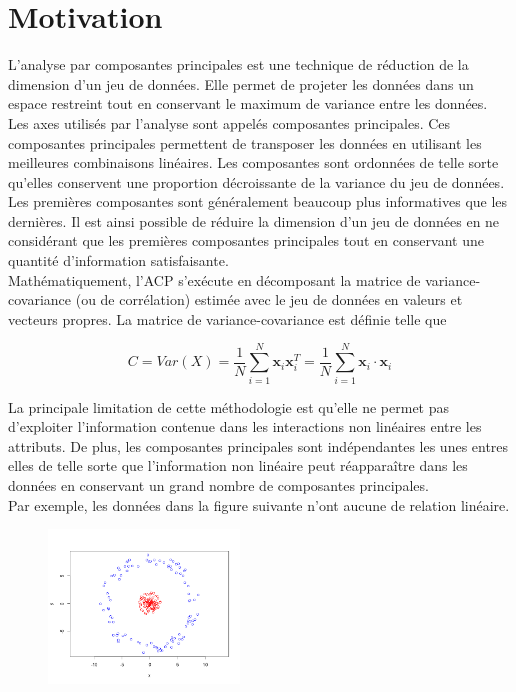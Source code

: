 \section{Motivation}

L’analyse par composantes principales est une technique de réduction de la dimension d’un jeu de données. Elle permet de projeter les données dans un espace restreint tout en conservant le maximum de variance entre les données. 
Les axes utilisés par l’analyse sont appelés composantes principales. Ces composantes principales permettent de transposer les 
données en utilisant les meilleures combinaisons linéaires. Les composantes sont ordonnées de telle sorte qu’elles conservent
 une proportion décroissante de la variance du jeu de données. Les premières composantes sont généralement beaucoup plus 
 informatives que les dernières. Il est ainsi possible de réduire la dimension d’un jeu de données en ne considérant que les premières composantes principales tout en conservant une quantité d’information satisfaisante.\\

Mathématiquement, l’ACP s'exécute en décomposant la matrice de variance-covariance (ou de corrélation) estimée avec le jeu de données en valeurs et vecteurs propres. La matrice de variance-covariance est définie telle que

$$C = Var(X) = \frac{1}{N} \sum_{i = 1}^{N}   \textbf{x}_i\textbf{x}_i^{T} = \frac{1}{N} \sum_{i = 1}^{N}   \textbf{x}_i \cdot \textbf{x}_i$$

La principale limitation de cette méthodologie est qu’elle ne permet pas d’exploiter l’information contenue dans les interactions non linéaires entre les attributs. De plus, les composantes principales sont indépendantes les unes entres elles de telle sorte que l'information non linéaire peut réapparaître dans les données en conservant un grand nombre de composantes principales. \\

Par exemple, les données dans la figure suivante n'ont aucune de relation linéaire. 

\begin{figure}[H]
	\centering
	\includegraphics[width=2in]{exemple_1_initial}
\end{figure}

